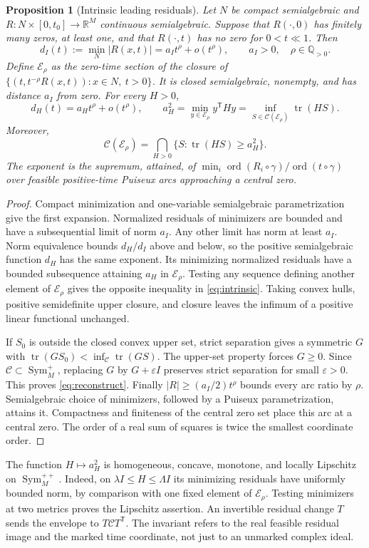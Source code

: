 \documentclass[11pt,reqno]{amsart}
\numberwithin{equation}{section}
\newtheorem{proposition}[theorem]{Proposition}
\theoremstyle{definition}
\theoremstyle{remark}
\newcommand{\R}{\mathbb R}
\newcommand{\Sym}{\operatorname{Sym}}
\newcommand{\tr}{\operatorname{tr}}
\newcommand{\ord}{\operatorname{ord}}
\newcommand{\cE}{\mathcal E}
\newcommand{\cC}{\mathcal C}
\newcommand{\eps}{\varepsilon}
\begin{document}
\begin{proposition}[Intrinsic leading residuals]\label{prop:intrinsic}
Let $N$ be compact semialgebraic and $R:N\times[0,t_0]\to\R^M$ continuous semialgebraic. Suppose that $R(\cdot,0)$ has finitely many zeros, at least one, and that $R(\cdot,t)$ has no zero for $0<t\ll1$. Then
\[
 d_I(t):=\min_N|R(x,t)|=a_I t^\rho+o(t^\rho),\qquad
 a_I>0,\quad\rho\in\mathbb Q_{>0}.
\]
Define $\cE_\rho$ as the zero-time section of the closure of
$\{(t,t^{-\rho}R(x,t)):x\in N,\ t>0\}$. It is closed semialgebraic, nonempty, and has distance $a_I$ from zero. For every $H>0$,
\begin{equation}\label{eq:intrinsic}
 d_H(t)=a_Ht^\rho+o(t^\rho),\qquad
 a_H^2=\min_{y\in\cE_\rho}y^{\mathsf T}Hy
      =\inf_{S\in\cC(\cE_\rho)}\tr(HS).
\end{equation}
Moreover,
\begin{equation}\label{eq:reconstruct}
 \cC(\cE_\rho)=\bigcap_{H>0}\{S:\tr(HS)\ge a_H^2\}.
\end{equation}
The exponent is the supremum, attained, of
$\min_i\ord(R_i\circ\gamma)/\ord(t\circ\gamma)$ over feasible positive-time Puiseux arcs approaching a central zero.
\end{proposition}
\begin{proof}
Compact minimization and one-variable semialgebraic parametrization give the first expansion. Normalized residuals of minimizers are bounded and have a subsequential limit of norm $a_I$. Any other limit has norm at least $a_I$. Norm equivalence bounds $d_H/d_I$ above and below, so the positive semialgebraic function $d_H$ has the same exponent. Its minimizing normalized residuals have a bounded subsequence attaining $a_H$ in $\cE_\rho$. Testing any sequence defining another element of $\cE_\rho$ gives the opposite inequality in \eqref{eq:intrinsic}. Taking convex hulls, positive semidefinite upper closure, and closure leaves the infimum of a positive linear functional unchanged.

If $S_0$ is outside the closed convex upper set, strict separation gives a symmetric $G$ with $\tr(GS_0)<\inf_{\cC}\tr(GS)$. The upper-set property forces $G\ge0$. Since $\cC\subset\Sym_M^+$, replacing $G$ by $G+\eps I$ preserves strict separation for small $\eps>0$. This proves \eqref{eq:reconstruct}. Finally $|R|\ge(a_I/2)t^\rho$ bounds every arc ratio by $\rho$. Semialgebraic choice of minimizers, followed by a Puiseux parametrization, attains it. Compactness and finiteness of the central zero set place this arc at a central zero. The order of a real sum of squares is twice the smallest coordinate order.
\end{proof}
The function $H\mapsto a_H^2$ is homogeneous, concave, monotone, and locally Lipschitz on $\Sym_M^{++}$. Indeed, on $\lambda I\le H\le\Lambda I$ its minimizing residuals have uniformly bounded norm, by comparison with one fixed element of $\cE_\rho$. Testing minimizers at two metrics proves the Lipschitz assertion. An invertible residual change $T$ sends the envelope to $T\cC T^{\mathsf T}$. The invariant refers to the real feasible residual image and the marked time coordinate, not just to an unmarked complex ideal.
\end{document}
